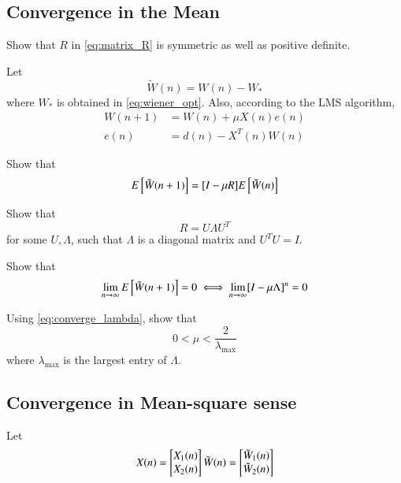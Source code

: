 \documentclass[journal,12pt,twocolumn]{IEEEtran}
\begin{document}
\subsection{Convergence in the Mean}
\begin{problem}
Show that $R$ in \eqref{eq:matrix_R} is symmetric as well as positive definite.
\end{problem}
%
Let
\begin{equation}
\tilde W(n)= W(n) - W_{*}
\end{equation}
%
where $W_{*}$ is obtained in \eqref{eq:wiener_opt}. Also, according to the LMS algorithm,
\begin{align}
\label{eq:wn_update}
W(n+1)&=W(n)+ \mu X(n) e(n)
\\
e(n) &= d(n) - X^{T}(n)W(n)
\end{align}
%
\begin{problem}
%
Show that
\begin{equation}
 E{}\left[\tilde W(n+1)\right]=[I - \mu R]E{}\left[\tilde W(n)\right]
\end{equation}
\end{problem}
\begin{problem}
Show that 
\begin{equation}
\label{eq:eigen_decompose}
R = U \Lambda U^{T}
\end{equation}
%
for some $U, \Lambda$, such that $\Lambda$ is a diagonal matrix and $U^TU = I$.
\end{problem}
%
\begin{problem}
Show that
\begin{equation}
\label{eq:converge_lambda}
\lim_{n \to \infty}E{}\left[\tilde W(n+1)\right] = 0 \iff \lim_{n\to \infty}[I - \mu \Lambda]^n = 0
\end{equation}
\end{problem}
%
\begin{problem}
Using \eqref{eq:converge_lambda}, show that
\begin{equation}
0 < \mu < \frac{2}{\lambda_{\max}}
\end{equation}
%
where $\lambda_{\max}$ is the largest entry of $\Lambda$.
\end{problem}
%
\subsection{Convergence in Mean-square sense}
Let 
\begin{equation}
 X(n)
 =
  \begin{bmatrix}
   X_1(n) \\ X_2(n)  \end{bmatrix}\\
\tilde W(n)
 =
  \begin{bmatrix}
   \tilde W_1(n) \\ \tilde W_2(n) \end{bmatrix}
\end{equation}
\end{document}
